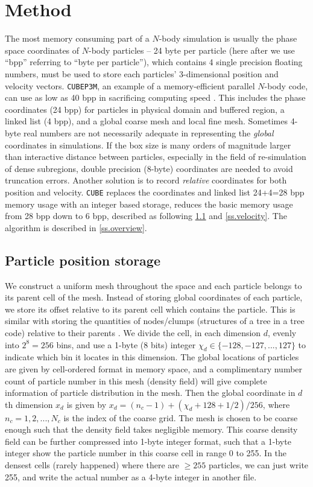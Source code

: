 \documentclass[10pt,twocolumn,preprint]{emulateapj}
\begin{document}
\section{Method}\label{s.method}
The most memory consuming part of a $N$-body simulation is usually the phase space coordinates of $N$-body particles -- 24 byte per particle (here after we use ``bpp'' referring to ``byte per particle''), which contains 4 single precision floating numbers, must be used to store each particles' 3-dimensional position and velocity vectors. {\tt CUBEP3M}, an example of a memory-efficient parallel $N$-body code, can use as low as 40 bpp in sacrificing computing speed \citep{2013MNRAS.436..540H}. This includes the phase coordinates (24 bpp) for particles in physical domain and buffered region, a linked list (4 bpp), and a global coarse mesh and local fine mesh. Sometimes 4-byte real numbers are not necessarily adequate in representing the {\it global} coordinates in simulations. If the box size is many orders of magnitude larger than interactive distance between particles, especially in the field of re-simulation of dense subregions, double precision (8-byte) coordinates are needed to avoid truncation errors. Another solution is to record {\it relative} coordinates for both position and velocity. {\tt CUBE} replaces the coordinates and linked list 24+4=28 bpp memory usage with an integer based storage, reduces the basic memory usage from 28 bpp down to 6 bpp, described as following \ref{ss.position} and \ref{ss.velocity}. The algorithm is described in \ref{ss.overview}.

\subsection{Particle position storage}\label{ss.position}
We construct a uniform mesh throughout the space and each particle belongs to its parent cell of the mesh. Instead of storing global coordinates of each particle, we store its offset relative to its parent cell which contains the particle. This is similar with storing the quantities of nodes/clumps (structures of a tree in a tree code) relative to their parents \citep{1985SJSSC...6...85A}. We divide the cell, in each dimension $d$, evenly into $2^8=256$ bins, and use a 1-byte (8 bits) integer $\chi_d \in \{-128,-127,...,127\}$ to indicate which bin it locates in this dimension. The global locations of particles are given by cell-ordered format in memory space, and a complimentary number count of particle number in this mesh (density field) will give complete information of particle distribution in the mesh. Then the global coordinate in $d$th dimension $x_d$ is given by $x_d=(n_c-1)+(\chi_d+128+1/2)/256$, where $n_c=1,2,...,N_c$ is the index of the coarse grid. The mesh is chosen to be coarse enough such that the density field takes negligible memory. This coarse density field can be further compressed into 1-byte integer format, such that a 1-byte integer show the particle number in this coarse cell in range 0 to 255. In the densest cells (rarely happened) where there are $\ge 255$ particles, we can just write 255, and write the actual number as a 4-byte integer in another file.
\end{document}
